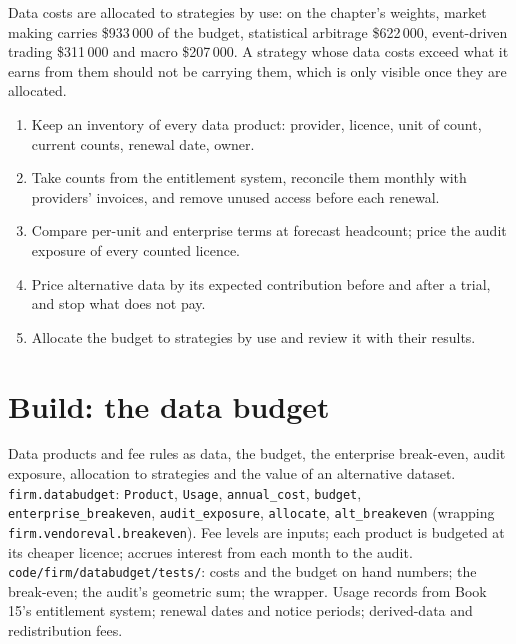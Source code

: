Data costs are allocated to strategies by use: on the chapter's weights, market making carries \$933\,000 of the budget, statistical arbitrage
\$622\,000, event-driven trading \$311\,000 and macro \$207\,000. A strategy whose data costs exceed what it earns from them should not be
carrying them, which is only visible once they are allocated.

\begin{method}\label{met:fm:data-strategy-and-costs:run}
\begin{enumerate}
\item Keep an inventory of every data product: provider, licence, unit of count, current counts, renewal date, owner.
\item Take counts from the entitlement system, reconcile them monthly with providers' invoices, and remove unused access before each renewal.
\item Compare per-unit and enterprise terms at forecast headcount; price the audit exposure of every counted licence.
\item Price alternative data by its expected contribution before and after a trial, and stop what does not pay.
\item Allocate the budget to strategies by use and review it with their results.
\end{enumerate}
\end{method}

\section{Build: the data budget}\label{bld:fm:data-strategy-and-costs:databudget}

\begin{build}
 Data products and fee rules as data, the budget, the enterprise break-even, audit exposure, allocation to strategies and the value
of an alternative dataset.
 \texttt{firm.databudget}: \texttt{Product}, \texttt{Usage}, \texttt{annual\_cost}, \texttt{budget}, \texttt{enterprise\_breakeven},
\texttt{audit\_exposure}, \texttt{allocate}, \texttt{alt\_breakeven} (wrapping \texttt{firm.vendoreval.breakeven}).
 Fee levels are inputs; each product is budgeted at its cheaper licence;  accrues interest from each month to the audit.
 \texttt{code/firm/databudget/tests/}: costs and the budget on hand numbers; the break-even; the audit's geometric sum; the
wrapper.
 Usage records from Book 15's entitlement system; renewal dates and notice periods; derived-data and redistribution fees.
\end{build}

